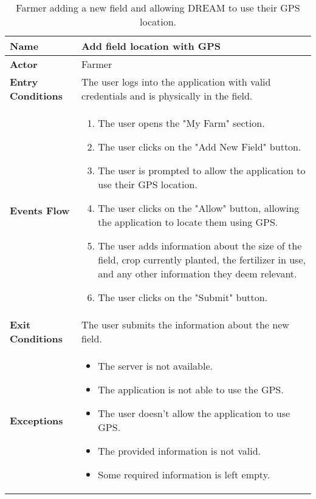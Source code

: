 \begin{table}[hbt!]
\centering
\small
\caption{\label{table:farmerNewField}Farmer adding a new field and allowing DREAM to use their GPS location.}
\renewcommand{\arraystretch}{1.25}
\begin{tabular}{|l|>{\raggedright\arraybackslash}m{12cm}|}

    \hline
    \textbf{Name} & Add field location with GPS\\
    \hline
   	\textbf{Actor} & Farmer\\
    \hline
    \textbf{Entry Conditions} & The user logs into the application with valid credentials and is physically in the field.\\
    \hline
    \textbf{Events Flow} & 
    		\begin{enumerate}
    			\item The user opens the "My Farm" section.
    			\item The user clicks on the "Add New Field" button.
    			\item The user is prompted to allow the application to use their GPS location.
    			\item The user clicks on the "Allow" button, allowing the application to locate them using GPS.
    			\item The user adds information about the size of the field, crop currently planted, the fertilizer in use, and any other information they deem relevant.
    			\item The user clicks on the "Submit" button.
    		\end{enumerate}
    	\\
    \hline
    \textbf{Exit Conditions} & The user submits the information about the new field.\\
    \hline
    \textbf{Exceptions} & 
    		\begin{itemize}
    			\item The server is not available.
    			\item The application is not able to use the GPS.
    			\item The user doesn't allow the application to use GPS.
    			\item The provided information is not valid.
    			\item Some required information is left empty.
    		\end{itemize}
    \\
    \hline
\end{tabular}
\end{table}